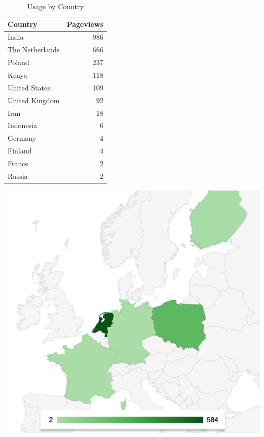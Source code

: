 \documentclass{article}
\begin{document}
\begin{table}[!htb]
	\begin{minipage}{.5\linewidth}
		\caption{Usage by Country}
		\centering
		\begin{tabular}{lr}
			\hline
			\textbf{Country} & \textbf{Pageviews} \\
			\hline
			India            & 986                \\
			The Netherlands  & 666                \\
			Poland           & 237                \\
			Kenya            & 118                \\
			United States    & 109                \\
			United Kingdom   & 92                 \\
			Iran             & 18                 \\
			Indonesia        & 6                  \\
			Germany          & 4                  \\
			Finland          & 4                  \\
			France           & 2                  \\
			Russia           & 2                  \\
			\hline
		\end{tabular}
	\end{minipage}%
	\hspace{.1cm}
	\begin{minipage}{.5\linewidth}
		\centering
		\centering
		\includegraphics[width=1\linewidth]{location-europe.png}
		\label{fig:test2}
	\end{minipage} 
\end{table}
\end{document}
